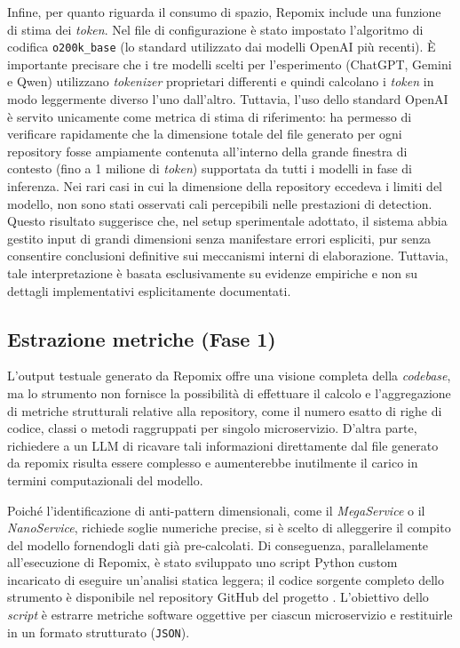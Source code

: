 Infine, per quanto riguarda il consumo di spazio, Repomix include una funzione di stima dei \textit{token}. Nel file di configurazione è stato impostato l'algoritmo di codifica \texttt{o200k\_base} (lo standard utilizzato dai modelli OpenAI più recenti). È importante precisare che i tre modelli scelti per l'esperimento (ChatGPT, Gemini e Qwen) utilizzano \textit{tokenizer} proprietari differenti e quindi calcolano i \textit{token} in modo leggermente diverso l'uno dall'altro. Tuttavia, l'uso dello standard OpenAI è servito unicamente come metrica di stima di riferimento: ha permesso di verificare rapidamente che la dimensione totale del file generato per ogni repository fosse ampiamente contenuta all'interno della grande finestra di contesto (fino a 1 milione di \textit{token}) supportata da tutti i modelli in fase di inferenza.
Nei rari casi in cui la dimensione della repository eccedeva i limiti del modello, non sono stati osservati cali percepibili nelle prestazioni di detection. Questo risultato suggerisce che, nel setup sperimentale adottato, il sistema abbia gestito input di grandi dimensioni senza manifestare errori espliciti, pur senza consentire conclusioni definitive sui meccanismi interni di elaborazione. Tuttavia, tale interpretazione è basata esclusivamente su evidenze empiriche e non su dettagli implementativi esplicitamente documentati.

\subsection{Estrazione metriche (Fase 1)}

L'output testuale generato da Repomix offre una visione completa della \textit{codebase}, ma lo strumento non fornisce la possibilità di effettuare il calcolo e l'aggregazione di metriche strutturali relative alla repository, come il numero esatto di righe di codice, classi o metodi raggruppati per singolo microservizio. D'altra parte, richiedere a un LLM di ricavare tali informazioni direttamente dal file generato da repomix risulta essere complesso e aumenterebbe inutilmente il carico in termini computazionali del modello.

Poiché l'identificazione di anti-pattern dimensionali, come il \textit{MegaService} o il \textit{NanoService}, richiede soglie numeriche precise, si è scelto di alleggerire il compito del modello fornendogli dati già pre-calcolati. Di conseguenza, parallelamente all'esecuzione di Repomix, è stato sviluppato uno script Python custom incaricato di eseguire un'analisi statica leggera; il codice sorgente completo dello strumento è disponibile nel repository GitHub del progetto \cite{barbato_tesi_llm_scripts}. L'obiettivo dello \textit{script} è estrarre metriche software oggettive per ciascun microservizio e restituirle in un formato strutturato (\texttt{JSON}).

